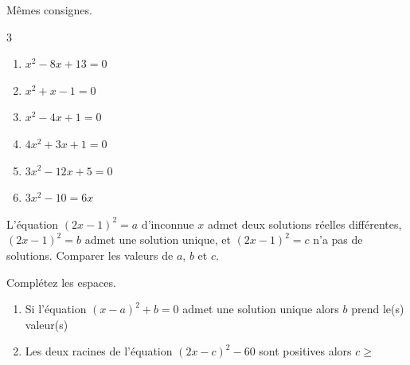 \documentclass[main.tex]{subfiles}
\begin{document}
\begin{exercise}[renforcement]\label{chapter03:exercice:resolutioncompletion} Mêmes consignes. 
		\vspace{-1em}
	\begin{multicols}{3}
		\begin{enumerate}[label={$(E_{\arabic*})$}, leftmargin=*]
			\item $x^2-8x+13=0$
			\item $x^2+x-1=0$ 
			\item $x^2-4x+1=0$ 
			\item $4x^2+3x+1=0$ 
			\item $3x^2-12x+5=0$ 
			\item $3x^2-10=6x$ 
		\end{enumerate} 
	\end{multicols} 
\end{exercise}
 
 
 
 
 
 \begin{exercise} L'équation $(2x-1)^2=a$ d'inconnue $x$ admet deux solutions réelles différentes,  $(2x-1)^2=b$ admet une solution unique, et $(2x-1)^2=c$ n'a pas de solutions. Comparer les valeurs de $a$, $b$ et $c$. 
 \end{exercise} 
 \begin{exercise} Complétez les espaces.\vspace{-0.5em}
 	\begin{enumerate}[label={\arabic*)\rule{0pt}{1.8em}},leftmargin=*]  
 		\item Si l'équation $(x-a)^2+b=0$ admet une solution unique alors $b$ prend le(s) valeur(s) \dotfill 
 		\item Les deux racines de l'équation $(2x-c)^2-60$ sont positives alors $c\geqslant $\dotfill 
 	\end{enumerate} 
 \end{exercise}
 
\end{document}
